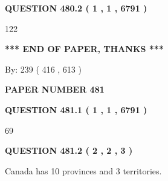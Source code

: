 \documentclass[12pt]{article}
\begin{document}
{\textbf{\Large{QUESTION
480.2 
 ( 1 , 1 , 6791 )
}}}
  
  
 
 
\noindent{}

122
 
 
   
   
 \vspace{0.2in}
 
   
   
   
   
\vspace{1.0in} 
{\textbf{\large{ *** END OF PAPER, THANKS *** }}} 
   
   
\hspace{1.0in} By: 
 239 ( 416 ,  613 )
   
   
   
   
\newpage 
\setcounter{page}{ 
   481001 } 
   
   
   
   
 {\textbf{ \Large{ PAPER NUMBER  481  }}}
   
   
\vspace{0.2in}
   
   
   
   
   
   
 \vspace{0.2in}
 
 
 
 
   
   
  
\vspace{0.2in}
  
{\textbf{\Large{QUESTION
481.1 
 ( 1 , 1 , 6791 )
}}}
  
  
 
 
\noindent{}

69
 
 
  
\vspace{0.2in}
  
{\textbf{\Large{QUESTION
481.2 
 ( 2 , 2 , 3 )
}}}
  
  
 
 
\noindent{}
 
 
Canada has 10  provinces and 3 territories.
 
\end{document}
